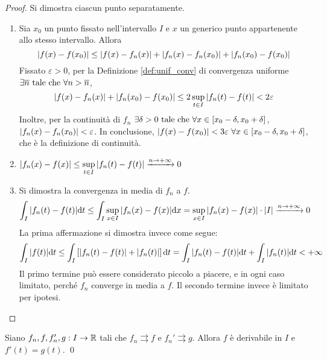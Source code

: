 \begin{proof}
    Si dimostra ciascun punto separatamente.
    \begin{enumerate}
        \item Sia $x_0$ un punto fissato nell'intervallo $I$ e $x$ un generico punto appartenente allo stesso intervallo. Allora
        $$
            \abs{f(x)-f(x_0)}\leq\abs{f(x)-f_n(x)}+\abs{f_n(x)-f_n(x_0)}+\abs{f_n(x_0)-f(x_0)}
        $$
        Fissato $\varepsilon > 0$, per la Definizione \ref{def:unif_conv} di convergenza uniforme $\exists \overline{n} \text{ tale che } \forall n > \overline{n}$,
        $$\abs{f(x)-f_n(x)}+\abs{f_n(x_0)-f(x_0)}\leq 2 \sup_{t \in I}\abs{f_n(t)-f(t)}<2\varepsilon$$
        Inoltre, per la continuità di $f_n$ $\exists \delta>0 \text{ tale che } \forall x \in [x_0-\delta,x_0+\delta]$, $\abs{f_n(x)-f_n(x_0)}<\varepsilon$.
        In conclusione, $\abs{f(x)-f(x_0)} < 3\varepsilon \ \forall x \in [x_0-\delta,x_0+\delta]$, che è la definizione di continuità.
        \item $\abs{f_n(x)-f(x)}\leq \sup\limits_{t\in I}\abs{f_n(t)-f(t)}\xrightarrow{n\to+\infty}0$
        \item Si dimostra la convergenza in media di $f_n$ a $f$.
        $$
            \int_I\abs{f_n(t)-f(t)}\dd t \leq \int_I\sup_{x\in I}\abs{f_n(x)-f(x)}\dd x=\sup_{x \in I}\abs{f_n(x)-f(x)}\cdot\abs{I}\xrightarrow{n\to +\infty}0
        $$
        La prima affermazione si dimostra invece come segue:
        $$
            \int_I\abs{f(t)}\dd t\leq \int_I\left[\abs{f_n(t)-f(t)}+\abs{f_n(t)}\right]\dd t=\int_I\abs{f_n(t)-f(t)}\dd t+\int_I\abs{f_n(t)}\dd t<+\infty
        $$
        Il primo termine può essere considerato piccolo a piacere, e in ogni caso limitato, perché $f_n$ converge in media a $f$. Il secondo termine invece è limitato per ipotesi.
    \end{enumerate}
\end{proof}

\begin{theorem}
    Siano $f_n, f, f_n', g: I \to \mathbb{R}$ tali che $f_n \rightrightarrows f$ e $f_n' \rightrightarrows g$. Allora $f$ è derivabile in $I$ e $f'(t) = g(t)$. \qed
\end{theorem}